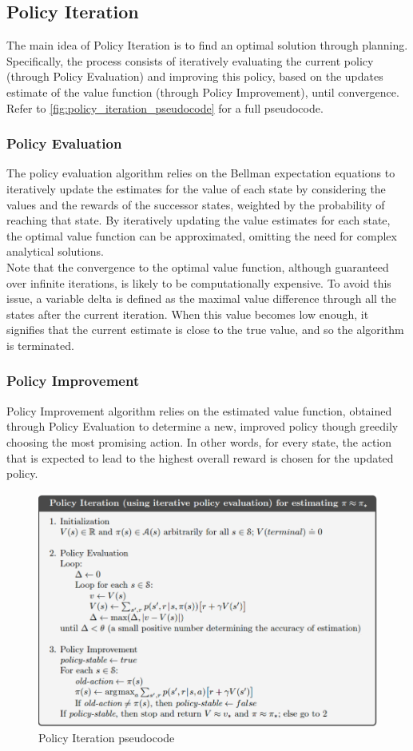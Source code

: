 \documentclass{class}
\begin{document}
\subsection{Policy Iteration}
The main idea of Policy Iteration is to find an optimal solution through planning. Specifically, the process consists of iteratively evaluating the current policy (through Policy Evaluation) and improving this policy, based on the updates estimate of the value function (through Policy Improvement), until convergence.\\[0.3cm]
Refer to \autoref{fig:policy_iteration_pseudocode} for a full pseudocode.

\subsubsection{Policy Evaluation}
The policy evaluation algorithm relies on the Bellman expectation equations to iteratively update the estimates for the value of each state by considering the values and the rewards of the successor states, weighted by the probability of reaching that state. By iteratively updating the value estimates for each state, the optimal value function can be approximated, omitting the need for complex analytical solutions.
\\[0.3cm]
Note that the convergence to the optimal value function, although guaranteed over infinite iterations, is likely to be computationally expensive. To avoid this issue, a variable delta is defined as the maximal value difference through all the states after the current iteration. When this value becomes low enough, it signifies that the current estimate is close to the true value, and so the algorithm is terminated.

\subsubsection{Policy Improvement}
Policy Improvement algorithm relies on the estimated value function, obtained through Policy Evaluation to determine a new, improved policy though greedily choosing the most promising action. In other words, for every state, the action that is expected to lead to the highest overall reward is chosen for the updated policy.
\begin{figure}[H]
    \centering
    \includegraphics[width=0.5\linewidth]{report_src/images/policy_iteration_pseudocode.png}
    \caption{Policy Iteration pseudocode \parencite[p. 80]{sutton-2018}}
    \label{fig:policy_iteration_pseudocode}
\end{figure}
\end{document}
